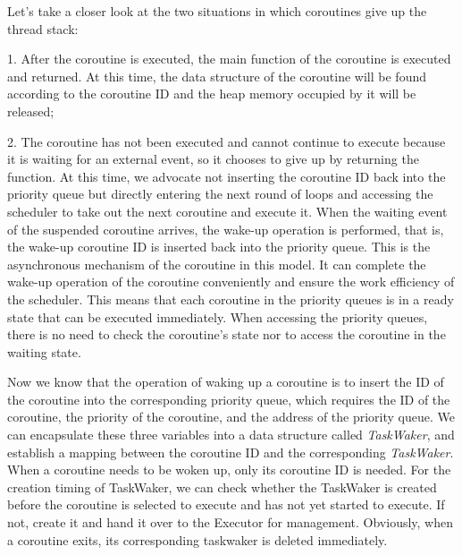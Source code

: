 \documentclass[10pt]{article}
\begin{document}
Let's take a closer look at the two situations in which coroutines give up the thread stack:

1. After the coroutine is executed, the main function of the coroutine is executed and returned. At this time, the data structure of the coroutine will be found according to the coroutine ID and the heap memory occupied by it will be released;

2. The coroutine has not been executed and cannot continue to execute because it is waiting for an external event, so it chooses to give up by returning the function. At this time, we advocate not inserting the coroutine ID back into the priority queue but directly entering the next round of loops and accessing the scheduler to take out the next coroutine and execute it. When the waiting event of the suspended coroutine arrives, the wake-up operation is performed, that is, the wake-up coroutine ID is inserted back into the priority queue. This is the asynchronous mechanism of the coroutine in this model. It can complete the wake-up operation of the coroutine conveniently and ensure the work efficiency of the scheduler. This means that each coroutine in the priority queues is in a ready state that can be executed immediately. When accessing the priority queues, there is no need to check the coroutine's state nor to access the coroutine in the waiting state.

Now we know that the operation of waking up a coroutine is to insert the ID of the coroutine into the corresponding priority queue, which requires the ID of the coroutine, the priority of the coroutine, and the address of the priority queue. We can encapsulate these three variables into a data structure called \textit{TaskWaker}, and establish a mapping between the coroutine ID and the corresponding \textit{TaskWaker}. When a coroutine needs to be woken up, only its coroutine ID is needed. For the creation timing of TaskWaker, we can check whether the TaskWaker is created before the coroutine is selected to execute and has not yet started to execute. If not, create it and hand it over to the Executor for management. Obviously, when a coroutine exits, its corresponding taskwaker is deleted immediately.
\end{document}
